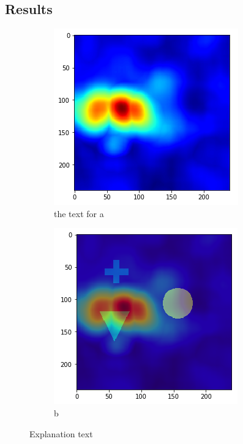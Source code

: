 \subsection{Results}
\begin{figure}[H]
    \centering
    \begin{subfigure}{.5\textwidth}
        \centering
        \includegraphics[width=\linewidth]{chapters/05_testnet/images/rise_1-0.png}
        \caption{ the text for a}
    \end{subfigure}%
    \begin{subfigure}{.5\textwidth}
        \centering
        \includegraphics[width=\linewidth]{chapters/05_testnet/images/rise_1-1.png}
        \caption{b}
    \end{subfigure}
    \caption{Explanation text}
    \label{testnet_rise_mean}
\end{figure}

